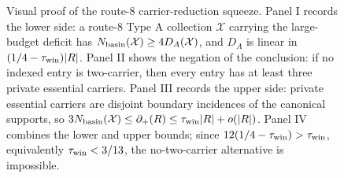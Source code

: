 \documentclass[11pt]{article}
\newcommand{\defp}{\partial_+}
\begin{document}
\begin{figure}[t]
{%
}
\caption[Visual proof of the route-8 carrier-reduction squeeze]{Visual proof of the route-8 carrier-reduction squeeze.  Panel I records the lower side: a route-8 Type A collection \(\mathcal X\) carrying the large-budget deficit has \(N_{\rm basin}(\mathcal X)\ge4D_A(\mathcal X)\), and \(D_A\) is linear in \((1/4-\tau_{\rm win})|R|\).  Panel II shows the negation of the conclusion: if no indexed entry is two-carrier, then every entry has at least three private essential carriers.  Panel III records the upper side: private essential carriers are disjoint boundary incidences of the canonical supports, so \(3N_{\rm basin}(\mathcal X)\le\defp(R)\le\tau_{\rm win}|R|+o(|R|)\).  Panel IV combines the lower and upper bounds; since \(12(1/4-\tau_{\rm win})>\tau_{\rm win}\), equivalently \(\tau_{\rm win}<3/13\), the no-two-carrier alternative is impossible.}
\label{fig:typeA-route8-carrier-reduction-squeeze}
\end{figure}
\end{document}
